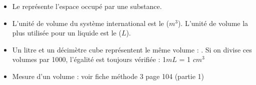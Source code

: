 \begin{mybilan}
	\begin{itemize}
		\item Le  représente l'espace occupé par une substance.\pause
		\item L'unité de volume du système international est le  ($m^3$). L'unité de volume la plus utilisée pour un liquide est le  ($L$).\pause
		\item Un litre et un décimètre cube représentent le même volume : . Si on divise ces volumes par \num{1000}, l'égalité est toujours vérifiée : 1$mL$ = 1 $cm^3$\pause
		\item Mesure d'un volume : voir fiche méthode 3 page 104 (partie 1)
	\end{itemize}
\end{mybilan}